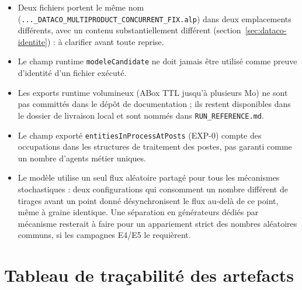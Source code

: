 \documentclass[11pt,a4paper]{article}
\newcommand{\code}[1]{\texttt{#1}}
\begin{document}
\begin{itemize}
  \item Deux fichiers portent le même nom (\code{...\_DATACO\_MULTIPRODUCT\_CONCURRENT\_FIX.alp})
        dans deux emplacements différents, avec un contenu substantiellement
        différent (section~\ref{sec:dataco-identite}) : à clarifier avant
        toute reprise.
  \item Le champ runtime \code{modeleCandidate} ne doit jamais être utilisé
        comme preuve d'identité d'un fichier exécuté.
  \item Les exports runtime volumineux (ABox TTL jusqu'à plusieurs Mo) ne
        sont pas committés dans le dépôt de documentation ; ils restent
        disponibles dans le dossier de livraison local et sont nommés dans
        \code{RUN\_REFERENCE.md}.
  \item Le champ exporté \code{entitiesInProcessAtPosts} (EXP-0) compte des
        occupations dans les structures de traitement des postes, pas
        garanti comme un nombre d'agents métier uniques.
  \item Le modèle utilise un seul flux aléatoire partagé pour tous les
        mécanismes stochastiques : deux configurations qui consomment un
        nombre différent de tirages avant un point donné désynchronisent le
        flux au-delà de ce point, même à graine identique. Une séparation
        en générateurs dédiés par mécanisme resterait à faire pour un
        appariement strict des nombres aléatoires communs, si les
        campagnes E4/E5 le requièrent.
\end{itemize}

\section{Tableau de traçabilité des artefacts}
\end{document}
